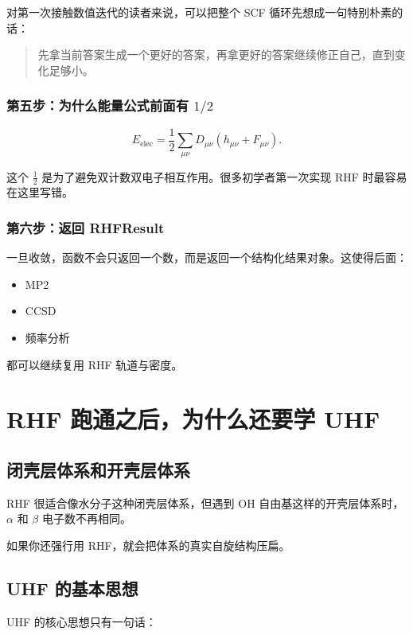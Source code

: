 \documentclass[UTF8,11pt,fontset=fandol]{ctexbook}
\begin{document}
对第一次接触数值迭代的读者来说，可以把整个 SCF 循环先想成一句特别朴素的话：

\begin{quote}
先拿当前答案生成一个更好的答案，再拿更好的答案继续修正自己，直到变化足够小。
\end{quote}

\subsection*{第五步：为什么能量公式前面有 \texorpdfstring{$1/2$}{1/2}}

\begin{equation}
E_{\mathrm{elec}}
=
\frac{1}{2}\sum_{\mu\nu}D_{\mu\nu}(h_{\mu\nu}+F_{\mu\nu}).
\end{equation}

这个 $\frac{1}{2}$ 是为了避免双计数双电子相互作用。很多初学者第一次实现 RHF 时最容易在这里写错。

\subsection*{第六步：返回 RHFResult}

一旦收敛，函数不会只返回一个数，而是返回一个结构化结果对象。这使得后面：
\begin{itemize}
  \item MP2
  \item CCSD
  \item 频率分析
\end{itemize}
都可以继续复用 RHF 轨道与密度。

\chapter{RHF 跑通之后，为什么还要学 UHF}

\section{闭壳层体系和开壳层体系}

RHF 很适合像水分子这种闭壳层体系，但遇到 OH 自由基这样的开壳层体系时，$\alpha$ 和 $\beta$ 电子数不再相同。

如果你还强行用 RHF，就会把体系的真实自旋结构压扁。

\section{UHF 的基本思想}

UHF 的核心思想只有一句话：
\end{document}
